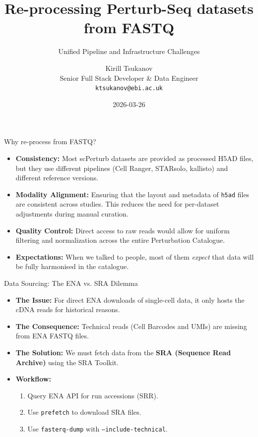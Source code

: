 \documentclass[handout]{beamer}
\title{Re-processing Perturb-Seq datasets from FASTQ}
\subtitle{Unified Pipeline and Infrastructure Challenges}
\date{2026-03-26}
\author{Kirill Tsukanov \\ Senior Full Stack Developer \& Data Engineer \\ \texttt{ktsukanov@ebi.ac.uk}}
\institute{PC Fortnightly Meeting}
\begin{document}
\begin{frame}
    \titlepage
\end{frame}

\begin{frame}{Why re-process from FASTQ?}
    \begin{itemize}
        \item \textbf{Consistency:} Most scPerturb datasets are provided as processed H5AD files, but they use different pipelines (Cell Ranger, STARsolo, kallisto) and different reference versions.
        \item \textbf{Modality Alignment:} Ensuring that the layout and metadata of \texttt{h5ad} files are consistent across studies. This reduces the need for per-dataset adjustments during manual curation.
        \item \textbf{Quality Control:} Direct access to raw reads would allow for uniform filtering and normalization across the entire Perturbation Catalogue.
        \item \textbf{Expectations:} When we talked to people, most of them \emph{expect} that data will be fully harmonised in the catalogue.
    \end{itemize}
\end{frame}

\begin{frame}{Data Sourcing: The ENA vs. SRA Dilemma}
    \begin{itemize}
        \item \textbf{The Issue:} For direct ENA downloads of single-cell data, it only hosts the cDNA reads for historical reasons.
        \item \textbf{The Consequence:} Technical reads (Cell Barcodes and UMIs) are missing from ENA FASTQ files.
        \item \textbf{The Solution:} We must fetch data from the \textbf{SRA (Sequence Read Archive)} using the SRA Toolkit.
        \item \textbf{Workflow:}
            \begin{enumerate}
                \item Query ENA API for run accessions (SRR).
                \item Use \texttt{prefetch} to download SRA files.
                \item Use \texttt{fasterq-dump} with \texttt{--include-technical}.
            \end{enumerate}
    \end{itemize}
\end{frame}
\end{document}

